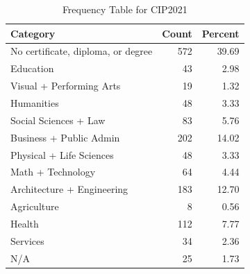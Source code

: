 \begin{table}[!h]
\centering
\caption{\label{tab:tab:CIP2021}Frequency Table for CIP2021}
\centering
\begin{tabular}[t]{lrr}
\toprule
Category & Count & Percent\\
\midrule
No certificate, diploma, or degree & 572 & 39.69\\
Education & 43 & 2.98\\
Visual + Performing Arts & 19 & 1.32\\
Humanities & 48 & 3.33\\
Social Sciences + Law & 83 & 5.76\\
\addlinespace
Business + Public Admin & 202 & 14.02\\
Physical + Life Sciences & 48 & 3.33\\
Math + Technology & 64 & 4.44\\
Architecture + Engineering & 183 & 12.70\\
Agriculture & 8 & 0.56\\
\addlinespace
Health & 112 & 7.77\\
Services & 34 & 2.36\\
N/A & 25 & 1.73\\
\bottomrule
\end{tabular}
\end{table}
